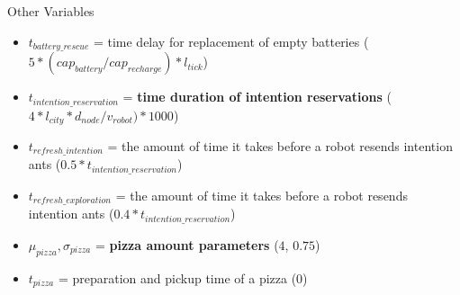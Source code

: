 \begin{frame}[allowframebreaks]{Other Variables}
\begin{itemize}
        \item $t_{battery\_rescue}$ = time delay for replacement of empty batteries {\tiny($5 * (cap_{battery} / cap_{recharge}) * l_{tick}$)}
        \item $t_{intention\_reservation}$ = \textbf{time duration of intention reservations} {\tiny($4 * l_{city} * d_{node} / v_{robot}) * 1000$)}
        \item $t_{refresh\_intention}$ = the amount of time it takes before a robot resends intention ants {\tiny($0.5 * t_{intention\_reservation}$)}
        \item $t_{refresh\_exploration}$ = the amount of time it takes before a robot resends intention ants {\tiny($0.4 * t_{intention\_reservation}$)}
        \item $\mu_{pizza}, \sigma_{pizza}$ = \textbf{pizza amount parameters} {\tiny($4$, $0.75$)}
        \item $t_{pizza}$ = preparation and pickup time of a pizza {\tiny($0$)}
    \end{itemize}
\end{frame}

